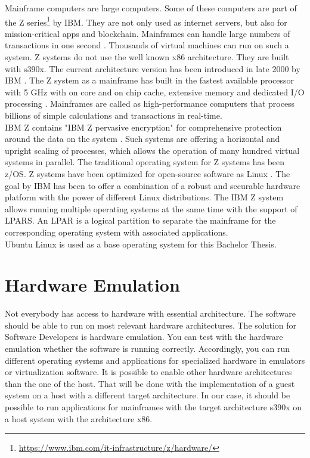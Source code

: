Mainframe computers are large computers. Some of these computers are part of the Z series\footnote{\url{https://www.ibm.com/it-infrastructure/z/hardware/}} by IBM. They are not only used as internet servers, but also for mission-critical apps and blockchain. 
Mainframes can handle large numbers of transactions in one second \cite[~p.56]{Tanenbaum2014}. 
Thousands of virtual machines can run on such a system. \gls{Z systems} do not use the well known x86 architecture. 
They are built with s390x. The current architecture version has been introduced in late 2000 by IBM \cite[~p.15]{Block2019}. The Z system as a mainframe has built in the fastest available processor with 5 GHz with on core and on chip cache, extensive memory and dedicated I/O processing \cite{OpenMainframeProject}.
Mainframes are called as high-performance computers that process billions of simple calculations and transactions in real-time.\\
IBM Z contains "IBM Z pervasive encryption" for comprehensive protection around the data on the system \cite[~p.4]{Lascu2020}. Such systems are offering a horizontal and upright \gls{scaling} of processes, which allows the operation of many hundred virtual systems in parallel\cite[~p.13]{Tschoeke2009}. The traditional operating system for Z systems has been z/OS. 
Z systems have been optimized for open-source software as Linux \cite[~p.8]{Lascu2020}. The goal by IBM has been to offer a combination of a robust and securable hardware platform with the power of different Linux distributions. 
The IBM Z system allows running multiple operating systems at the same time with the support of LPARS.
An \gls{LPAR} is a logical partition to separate the mainframe for the corresponding operating system with associated applications. \\
Ubuntu Linux is used as a base operating system for this Bachelor Thesis.


\section{Hardware Emulation}

Not everybody has access to hardware with essential architecture. The software should be able to run on most relevant hardware architectures. The solution for Software Developers is hardware emulation. 
You can test with the hardware emulation whether the software is running correctly. 
Accordingly, you can run different operating systems and applications for specialized hardware in emulators or virtualization software. 
It is possible to enable other hardware architectures than the one of the host. 
That will be done with the implementation of a guest system on a host with a different target architecture\cite[~p.3]{Rosenthal2015}. In our case, it should be possible to run applications for mainframes with the target
architecture s390x on a host system with the architecture x86.


